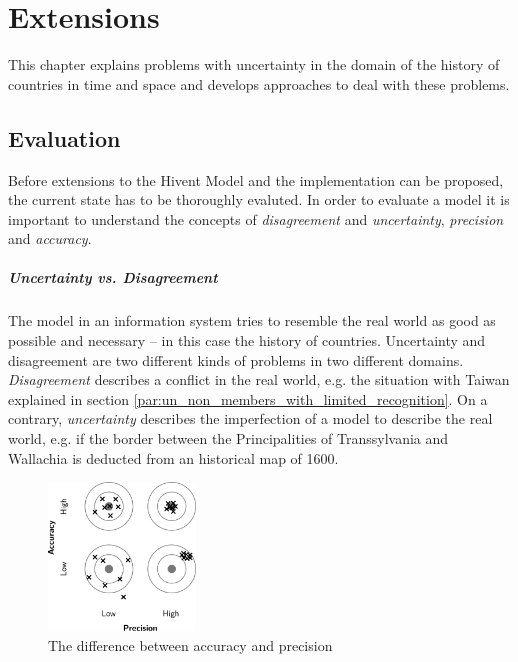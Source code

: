 
\chapter{Extensions} %
\label{cha:extensions}

This chapter explains problems with uncertainty in the domain of the history of countries in time and space and develops approaches to deal with these problems.

\section{Evaluation} %
\label{sec:evaluation}

Before extensions to the Hivent Model and the implementation can be proposed, the current state has to be thoroughly evaluted. In order to evaluate a model it is important to understand the concepts of \emph{disagreement} and \emph{uncertainty}, \emph{precision} and \emph{accuracy}.

\paragraph{Uncertainty vs. Disagreement} %
\label{par:uncertainty_vs_disagreement}

The model in an information system tries to resemble the real world as good as possible and necessary -- in this case the history of countries. Uncertainty and disagreement are two different kinds of problems in two different domains.
\emph{Disagreement} describes a conflict in the real world, e.g. the situation with Taiwan explained in section \ref{par:un_non_members_with_limited_recognition}. On a contrary, \emph{uncertainty} describes the imperfection of a model to describe the real world, e.g. if the border between the Principalities of Transsylvania and Wallachia is deducted from an historical map of 1600.

\begin{figure}[ht]
  \vspace{1em}
  \centering
  \includegraphics[width = 0.35\textwidth]{graphics/extensions/accuracy_precision}
  \caption{The difference between accuracy and precision}
  \label{fig:accuracy_precision}
\end{figure}

